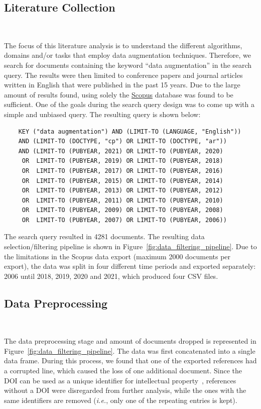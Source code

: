 \subsection{Literature Collection}~\label{sec:lit_collection-aug}

The focus of this literature analysis is to understand the different
algorithms, domains and/or tasks that employ data augmentation techniques.
Therefore, we search for documents containing the keyword ``data
augmentation'' in the search query. The results were then limited to
conference papers and journal articles written in English that were published
in the past 15 years.  Due to the large amount of results found, using solely
the \href{https://www.scopus.com/}{Scopus} database was found to be
sufficient. One of the goals during the search query design was to come up
with a simple and unbiased query. The resulting query is shown below:

\begin{verbatim}
    KEY ("data augmentation") AND (LIMIT-TO (LANGUAGE, "English"))  
    AND (LIMIT-TO (DOCTYPE, "cp") OR LIMIT-TO (DOCTYPE, "ar"))  
    AND (LIMIT-TO (PUBYEAR, 2021) OR LIMIT-TO (PUBYEAR, 2020)  
     OR  LIMIT-TO (PUBYEAR, 2019) OR LIMIT-TO (PUBYEAR, 2018)  
     OR  LIMIT-TO (PUBYEAR, 2017) OR LIMIT-TO (PUBYEAR, 2016)  
     OR  LIMIT-TO (PUBYEAR, 2015) OR LIMIT-TO (PUBYEAR, 2014)  
     OR  LIMIT-TO (PUBYEAR, 2013) OR LIMIT-TO (PUBYEAR, 2012)  
     OR  LIMIT-TO (PUBYEAR, 2011) OR LIMIT-TO (PUBYEAR, 2010)  
     OR  LIMIT-TO (PUBYEAR, 2009) OR LIMIT-TO (PUBYEAR, 2008)  
     OR  LIMIT-TO (PUBYEAR, 2007) OR LIMIT-TO (PUBYEAR, 2006))  
\end{verbatim}
\bigskip

The search query resulted in 4281 documents. The resulting data
selection/filtering pipeline is shown in
Figure~\ref{fig:data_filtering_pipeline}. Due to the limitations in the Scopus
data export (maximum 2000 documents per export), the data was split in four
different time periods and exported separately: 2006 until 2018, 2019, 2020
and 2021, which produced four CSV files.

\subsection{Data Preprocessing}~\label{sec:data_preprocessing-aug}

The data preprocessing stage and amount of documents dropped is represented in
Figure~\ref{fig:data_filtering_pipeline}. The data was first concatenated into
a single data frame. During this process, we found that one of the exported
references had a corrupted line, which caused the loss of one additional
document.  Since the DOI can be used as a unique identifier for intellectual
property~\cite{Paskin1999}, references without a DOI were disregarded from
further analysis, while the ones with the same identifiers are removed
(\textit{i.e.}, only one of the repeating entries is kept).

